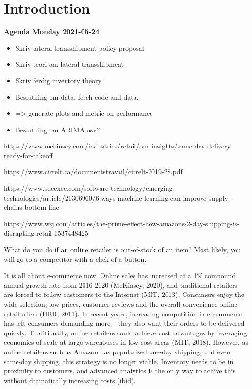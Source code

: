 \documentclass[../../main.tex]{subfiles}
\begin{document}

\chapter{Introduction}

\textbf{Agenda Monday 2021-05-24}
\begin{itemize}
\item  Skriv lateral transshipment policy proposal
\item  Skriv teori om lateral transshipment
\item  Skriv ferdig inventory theory 
\item  Beslutning om data, fetch code and data.
\item  => generate plots and metric on performance
\item  Beslutning om ARIMA osv?
\end{itemize}


https://www.mckinsey.com/industries/retail/our-insights/same-day-delivery-ready-for-takeoff

https://www.cirrelt.ca/documentstravail/cirrelt-2019-28.pdf

https://www.sdcexec.com/software-technology/emerging-technologies/article/21306960/6-ways-machine-learning-can-improve-supply-chains-bottom-line

https://www.wsj.com/articles/the-prime-effect-how-amazons-2-day-shipping-is-disrupting-retail-1537448425

What do you do if an online retailer is out-of-stock of an item? Most likely, you will go to a competitor with a click of a button.


It is all about e-commerce now. Online sales has increased at a 1\% compound annual growth rate from 2016-2020 (McKinsey, 2020), and traditional retailers are forced to follow customers to the Internet (MIT, 2013). Consumers enjoy the wide selection, low prices, customer reviews and the overall convenience online retail offers (HBR, 2011). In recent years, increasing competition in e-commerce has left consumers demanding more – they also want their orders to be delivered quickly. Traditionally, online retailers could achieve cost advantages by leveraging economies of scale at large warehouses in low-cost areas (MIT, 2018). However, as online retailers such as Amazon has popularized one-day shipping, and even same-day shipping, this strategy is no longer viable. Inventory needs to be in proximity to  customers, and advanced analytics is the only way to achive this without dramatically increasing costs (ibid).
\end{document}
